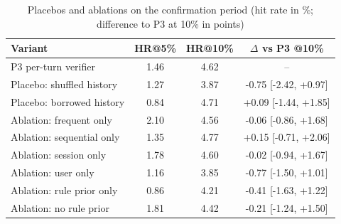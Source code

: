 \begin{table}[t]
\caption{Placebos and ablations on the confirmation period (hit rate in \%; difference to P3 at 10\% in points)}
\label{tab:controls}
\centering
\footnotesize
\setlength{\tabcolsep}{3pt}
\begin{tabular}{@{}lccc@{}}
\toprule
Variant & HR@5\% & HR@10\% & $\Delta$ vs P3 @10\% \\
\midrule
P3 per-turn verifier & 1.46 & 4.62 & -- \\
Placebo: shuffled history & 1.27 & 3.87 & -0.75 [-2.42, +0.97] \\
Placebo: borrowed history & 0.84 & 4.71 & +0.09 [-1.44, +1.85] \\
Ablation: frequent only & 2.10 & 4.56 & -0.06 [-0.86, +1.68] \\
Ablation: sequential only & 1.35 & 4.77 & +0.15 [-0.71, +2.06] \\
Ablation: session only & 1.78 & 4.60 & -0.02 [-0.94, +1.67] \\
Ablation: user only & 1.16 & 3.85 & -0.77 [-1.50, +1.01] \\
Ablation: rule prior only & 0.86 & 4.21 & -0.41 [-1.63, +1.22] \\
Ablation: no rule prior & 1.81 & 4.42 & -0.21 [-1.24, +1.50] \\
\bottomrule
\end{tabular}
\end{table}